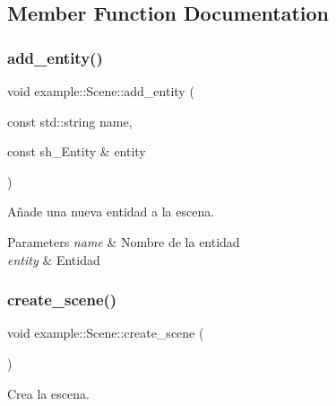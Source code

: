 \subsection{Member Function Documentation}
\mbox{\label{classexample_1_1_scene_a2d5d63db1f3b6f1b2c50d4c8f9a9a214}} 
\subsubsection{\texorpdfstring{add\_entity()}{add\_entity()}}
{\footnotesize\ttfamily void example\+::\+Scene\+::add\+\_\+entity (\begin{DoxyParamCaption}\item[{const std\+::string}]{name,  }\item[{const sh\+\_\+\+Entity \&}]{entity }\end{DoxyParamCaption})}



Añade una nueva entidad a la escena. 


\begin{DoxyParams}{Parameters}
{\em name} & Nombre de la entidad \\
\hline
{\em entity} & Entidad \\
\hline
\end{DoxyParams}
\mbox{\label{classexample_1_1_scene_ae5a6d62e493fed05e5a3271110148f07}} 
\subsubsection{\texorpdfstring{create\_scene()}{create\_scene()}}
{\footnotesize\ttfamily void example\+::\+Scene\+::create\+\_\+scene (\begin{DoxyParamCaption}{ }\end{DoxyParamCaption})}



Crea la escena. 

\mbox{\label{classexample_1_1_scene_a152fd318698a4fc4fbf40d865cc7683a}} 
